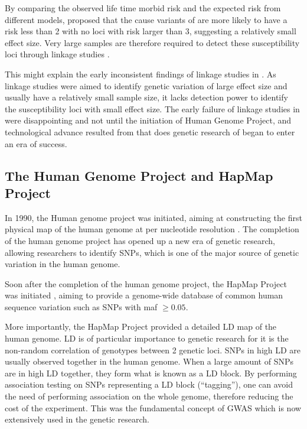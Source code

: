 \documentclass[12pt]{scrbook}
\newcommand*{\glng}{\glsentrylong}
\begin{document}
	By comparing the observed life time morbid risk and the expected risk from different models, \citet{Risch1990} proposed that the cause variants of \glng{scz} are more likely to have a risk less than 2 with no loci with risk larger than 3, suggesting a relatively small effect size.
	Very large samples are therefore required to detect these susceptibility loci through linkage studies \citep{Risch1990}.
	
	This might explain the early inconsistent findings of linkage studies in \glng{scz} \citep{Harrison2005}.
	As linkage studies were aimed to identify genetic variation of large effect size and usually have a relatively small sample size, it lacks detection power to identify the susceptibility loci with small effect size.
	The early failure of linkage studies in \glng{scz} were disappointing and not until the initiation of Human Genome Project, and technological advance resulted from that does genetic research of \glng{scz} began to enter an era of success.
	
	\subsection{The Human Genome Project and HapMap Project}
	In 1990, the Human genome project was initiated, aiming at constructing the first physical map of the human genome at per nucleotide resolution \citep{Lander2001}.
	The completion of the human genome project has opened up a new era of genetic research, allowing researchers to identify \glspl{SNP}, which is one of the major source of genetic variation in the human genome.
	
	Soon after the completion of the human genome project, the HapMap Project was initiated \citep{Consortium2005}, aiming to provide a genome-wide database of common human sequence variation such as \glspl{SNP} with \gls{maf} $\ge0.05$.
	
	More importantly, the HapMap Project provided a detailed \gls{LD} map of the human genome.
	\gls{LD} is of particular importance to genetic research for it is the non-random correlation of genotypes between 2 genetic loci. 
	\glspl{SNP} in high \gls{LD} are usually observed together in the human genome.
	When a large amount of \glspl{SNP} are in high \gls{LD} together, they form what is known as a \gls{LD} block.
	By performing association testing on \glspl{SNP} representing a \gls{LD} block (``tagging''), one can avoid the need of performing association on the whole genome, therefore reducing the cost of the experiment.
	This was the fundamental concept of \gls{GWAS} which is now extensively used in the genetic research.
	
\end{document}
